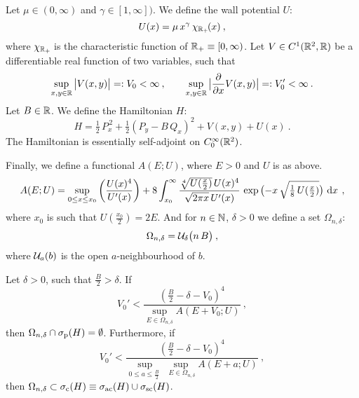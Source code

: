 \begin{defn}[Hamiltonian]
    Let $\mu \in (0, \infty)$ and $\gamma \in [1, \infty])$. We define the wall potential $U$:
    \begin{equation*}
        U(x) = \mu \, x^\gamma \, \chi_{\mathbb{R}_+\!}(x)
        \: ,
    \end{equation*}
    where $\chi_{\mathbb{R}_+\!}$ is the characteristic function of $\mathbb{R}_+ \equiv [0, \infty)$. Let $V \in C^1(\mathbb{R}^2, \mathbb{R})$ be a differentiable real function of two variables, such that
    \begin{equation*}
        \sup_{x,y \in \mathbb{R}} \big| V(x,y) \big| =: V_0 < \infty
        \: , \qquad
        \sup_{x,y \in \mathbb{R}} \big| \frac{\partial }{\partial x} V(x,y) \big| =: V_0' < \infty
        \: .
    \end{equation*}
    Let $B \in \mathbb{R}$. We define the Hamiltonian $H$:
    \begin{equation*}
        H
        = \tfrac{1}{2} \, P_x^{\,2}
        + \tfrac{1}{2}(P_y - B\, Q_x)^2
        + V(x, y)
        + U(x)
        \: .
    \end{equation*}
    The Hamiltonian is essentially self-adjoint on $C^\infty_0(\mathbb{R}^2)$.
\end{defn}
\begin{defn}[Auxiliary]
    Finally, we define a functional $A(E; U)$, where $E>0$ and $U$ is as above.
    \begin{equation*}
        A(E; U)
        = \sup_{0 \leq x \leq x_0}
        \left( \frac{U(x)^4}{U'(x)} \right)
        + 8 \int_{x_0}^\infty
        \frac{ \sqrt[4]{U(\tfrac{x}{2})} \, U(x)^4 }{ \sqrt{2\pi x} \, U'(x)}
        \, \exp \big( {-x} \, \sqrt{\tfrac{1}{8}\,U(\tfrac{x}{2})} \big)
        \, \, \mathrm{d}x \,
        \: ,
    \end{equation*}
    where $x_0$ is such that $U(\tfrac{x_0}{2}) = 2E$. And for $n \in \mathbb{N}$, $\delta>0$ we define a set $\Omega_{n,\delta}$:
    \begin{equation*}
        \Omega_{n, \delta} = \mathcal{U}_\delta\big( n \, B \big)
        \: ,
    \end{equation*}
    where $\mathcal{U}_a(b)$ is the open $a$-neighbourhood of $b$.
\end{defn}

\begin{thm}
    Let $\delta>0$, such that $\tfrac{B}{2} > \delta$. If
    \begin{equation*}
        V_0' < \frac{
            \left(\tfrac{B}{2} - \delta - V_0\right)^4
        }{
            \displaystyle \sup_{E \in \Omega_{n,\delta}}
            A(E+V_0; U)
        }
        \: ,
    \end{equation*}
    then $\Omega_{n,\delta} \cap \sigma_{\mathrm{p}}(H) = \emptyset$. Furthermore, if
    \begin{equation*}
        V_0' < \frac{
            \left(\tfrac{B}{2} - \delta - V_0\right)^4
        }{
            \displaystyle
            \sup_{0 \leq a \leq \tfrac{B}{2} \;}
            \sup_{\; E \in \Omega_{n,\delta}}
            A(E+a; U)
        }
        \: ,
    \end{equation*}
    then $\Omega_{n, \delta} \subset \sigma_{\mathrm{c}}(H) \equiv \sigma_{\mathrm{ac}}(H) \cup \sigma_{\mathrm{sc}}(H)$.
\end{thm}


